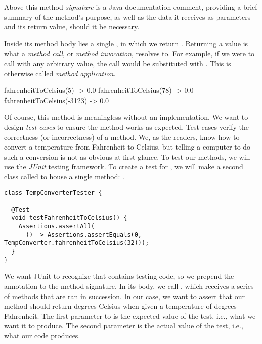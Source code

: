 Above this method \textit{signature} is a Java documentation comment, providing a brief summary of the method's purpose, as well as the data it receives as parameters and its return value, should it be necessary. 

Inside its method body lies a single , in which we return . Returning a value is what a \textit{method call}, or \textit{method invocation}, resolves to. For example, if we were to call  with any arbitrary  value, the call would be substituted with . This is otherwise called \textit{method application}.

\begin{verbnobox}[\footnotesize]
fahrenheitToCelsius(5)     -> 0.0
fahrenheitToCelsius(78)    -> 0.0
fahrenheitToCelsius(-3123) -> 0.0
\end{verbnobox}

Of course, this method is meaningless without an implementation. We want to design \textit{test cases} to ensure the method works as expected. Test cases verify the correctness (or incorrectness) of a method. We, as the readers, know how to convert a temperature from Fahrenheit to Celsius, but telling a computer to do such a conversion is not as obvious at first glance. To test our methods, we will use the \textit{JUnit} testing framework. To create a test for , we will make a second class called  to house a single method: .

\begin{cl}{}
\begin{lstlisting}[language=MyJava]
class TempConverterTester {

  @Test
  void testFahrenheitToCelsius() {
    Assertions.assertAll(
      () -> Assertions.assertEquals(0, TempConverter.fahrenheitToCelsius(32)));
  }
}
\end{lstlisting}
\end{cl}

We want JUnit to recognize that  contains testing code, so we prepend the  annotation to the method signature. In its body, we call , which receives a series of methods that are ran in succession. In our case, we want to assert that our  method should return  degrees Celsius when given a temperature of  degrees Fahrenheit. The first parameter to  is the expected value of the test, i.e., what we want it to produce. The second parameter is the actual value of the test, i.e., what our code produces. 

